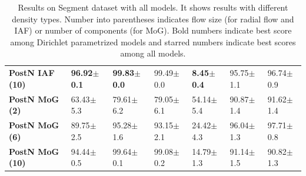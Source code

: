 \begin{table}[ht]
{\begin{tabular}{lllllll}
\textbf{PostN IAF (10) } &  \textbf{96.92$\pm$0.1} &        \textbf{99.83$\pm$0.0} &          99.49$\pm$0.0 &   \textbf{8.45$\pm$0.4} &      95.75$\pm$1.1 &       96.74$\pm$0.9 \\
\textbf{PostN MoG (2)  } &  63.43$\pm$5.3 &        79.61$\pm$6.2 &          79.05$\pm$6.1 &  54.14$\pm$5.4 &      90.87$\pm$1.4 &       91.62$\pm$1.4 \\
\textbf{PostN MoG (6)  } &  89.75$\pm$2.5 &        95.28$\pm$1.6 &          93.15$\pm$2.1 &  24.42$\pm$4.3 &      96.04$\pm$1.3 &       97.71$\pm$0.8 \\
\textbf{PostN MoG (10) } &  94.44$\pm$0.5 &        99.64$\pm$0.1 &          99.08$\pm$0.2 &  14.79$\pm$1.3 &      91.14$\pm$1.5 &       90.82$\pm$1.3 \\
\bottomrule
\end{tabular}

    }
    \caption{Results on Segment dataset with all models. It shows results with different density types. Number into parentheses indicates flow size (for radial flow and IAF) or number of components (for MoG). Bold numbers indicate best score among Dirichlet parametrized models and starred numbers indicate best scores among all models.}
    \label{fig:unc_segment_full}
\end{table}

\begin{table}[ht]
    \caption{Ablation study results on Segment dataset. Gray cells indicate significant drops in scores compare to the complete \oursacro Rad. (6) model in Table \ref{fig:unc_segment_full}.}
    \label{fig:ablation_segment}
\end{table}

